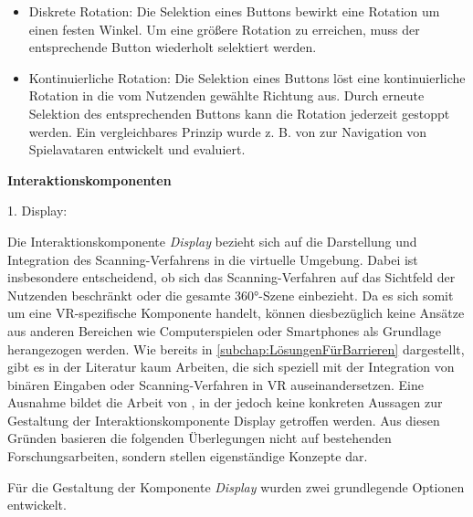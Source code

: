 \begin{itemize}
    \item Diskrete Rotation: Die Selektion eines Buttons bewirkt eine Rotation um einen festen Winkel. Um eine größere Rotation zu erreichen, muss der entsprechende Button wiederholt selektiert werden.
    \item Kontinuierliche Rotation: Die Selektion eines Buttons löst eine kontinuierliche Rotation in die vom Nutzenden gewählte Richtung aus. Durch erneute Selektion des entsprechenden Buttons kann die Rotation jederzeit gestoppt werden. Ein vergleichbares Prinzip wurde z. B. von \citet{10.1145/2159365.2159386} zur Navigation von Spielavataren entwickelt und evaluiert. 
\end{itemize}

{\normalfont \bfseries Interaktionskomponenten}  

1. Display:

Die Interaktionskomponente \textit{Display} bezieht sich auf die Darstellung und Integration des Scanning-Verfahrens in die virtuelle Umgebung. Dabei ist insbesondere entscheidend, ob sich das Scanning-Verfahren auf das Sichtfeld der Nutzenden beschränkt oder die gesamte 360°-Szene einbezieht. Da es sich somit um eine VR-spezifische Komponente handelt, können diesbezüglich keine Ansätze aus anderen Bereichen wie Computerspielen oder Smartphones als Grundlage herangezogen werden. Wie bereits in \autoref{subchap:LösungenFürBarrieren} dargestellt, gibt es in der Literatur kaum Arbeiten, die sich speziell mit der Integration von binären Eingaben oder Scanning-Verfahren in VR auseinandersetzen. Eine Ausnahme bildet die Arbeit von \citet{valakou_framework_2024}, in der jedoch keine konkreten Aussagen zur Gestaltung der Interaktionskomponente Display getroffen werden. Aus diesen Gründen basieren die folgenden Überlegungen nicht auf bestehenden Forschungsarbeiten, sondern stellen eigenständige Konzepte dar.

Für die Gestaltung der Komponente \textit{Display} wurden zwei grundlegende Optionen entwickelt.

